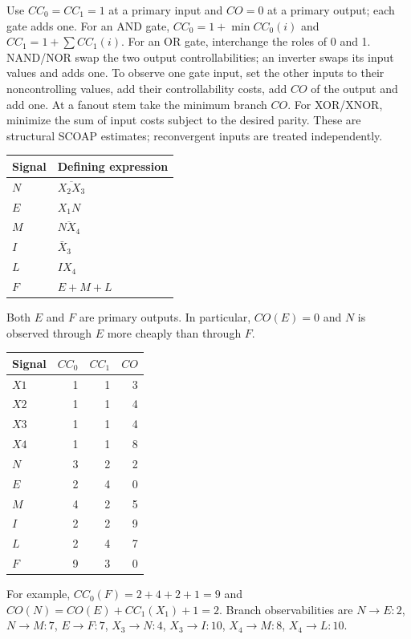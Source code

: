 \documentclass[11pt]{article}
\begin{document}
Use $CC_0=CC_1=1$ at a primary input and $CO=0$ at a primary output;
each gate adds one. For an AND gate,
$CC_0=1+\min CC_0(i)$ and $CC_1=1+\sum CC_1(i)$.
For an OR gate, interchange the roles of 0 and 1.
NAND/NOR swap the two output controllabilities; an inverter swaps its input
values and adds one. To observe one gate input, set the other inputs to their
noncontrolling values, add their controllability costs, add $CO$ of the output
and add one. At a fanout stem take the minimum branch $CO$.
For XOR/XNOR, minimize the sum of input costs subject to the desired parity.
These are structural SCOAP estimates; reconvergent inputs are treated independently.
\begin{center}\begin{tabular}{ll}\toprule Signal & Defining expression\\\midrule
$N$ & $\overline{X_2X_3}$\\
$E$ & $X_1N$\\
$M$ & $\overline{NX_4}$\\
$I$ & $\bar X_3$\\
$L$ & $IX_4$\\
$F$ & $E+M+L$\\
\bottomrule\end{tabular}\end{center}
Both $E$ and $F$ are primary outputs. In particular,
$CO(E)=0$ and $N$ is observed through $E$ more cheaply than through $F$.
\begin{center}\begin{tabular}{lrrr}\toprule
Signal & $CC_0$ & $CC_1$ & $CO$\\\midrule
$X1$ & 1 & 1 & 3\\
$X2$ & 1 & 1 & 4\\
$X3$ & 1 & 1 & 4\\
$X4$ & 1 & 1 & 8\\
$N$ & 3 & 2 & 2\\
$E$ & 2 & 4 & 0\\
$M$ & 4 & 2 & 5\\
$I$ & 2 & 2 & 9\\
$L$ & 2 & 4 & 7\\
$F$ & 9 & 3 & 0\\
\bottomrule\end{tabular}\end{center}
For example,
$CC_0(F)=2+4+2+1=9$ and $CO(N)=CO(E)+CC_1(X_1)+1=2$.
Branch observabilities are $N\to E:2$, $N\to M:7$,
$E\to F:7$, $X_3\to N:4$, $X_3\to I:10$,
$X_4\to M:8$, $X_4\to L:10$.
\end{document}
